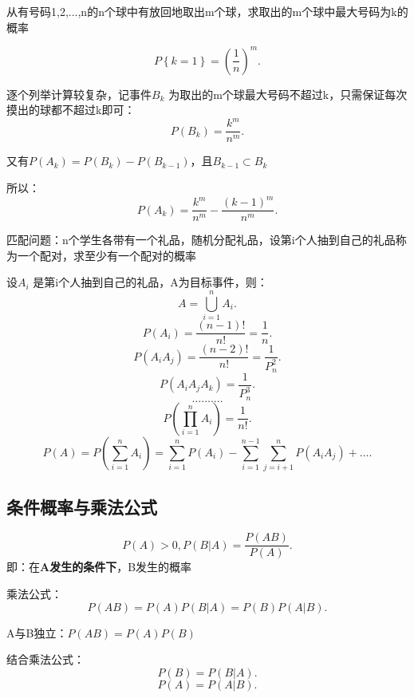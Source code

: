 \begin{eg}
    从有号码1,2,...,n的n个球中有放回地取出m个球，求取出的m个球中最大号码为k的概率

    \[
        P\left\{ k=1 \right\} =\left( \frac{1}{n} \right) ^m
    .\]  

    逐个列举计算较复杂，记事件$B_k$ 为取出的m个球最大号码不超过k，只需保证每次摸出的球都不超过k即可：
    \[
        P\left( B_{k} \right) =\frac{k^m}{n^m}
    .\] 

    又有$P\left( A_{k} \right) =P\left( B_{k} \right) -P\left( B_{k-1} \right) $，且$B_{k-1}\subset B_{k}$ 

    所以：\[
        P\left( A_k \right) =\frac{k^m}{n^m}-\frac{\left( k-1 \right) ^m}{n^m}
    .\] 
\end{eg}
 
\begin{eg}
    匹配问题：n个学生各带有一个礼品，随机分配礼品，设第i个人抽到自己的礼品称为一个配对，求至少有一个配对的概率

    设$A_{i}$ 是第i个人抽到自己的礼品，A为目标事件，则： \[
        A=\bigcup_{i=1}^{n}A_{i}
    .\] 
    \[
        P\left( A_{i} \right) =\frac{\left( n-1 \right) !}{n!}=\frac{1}{n}
    .\] 
    \[
        P\left( A_iA_j \right) =\frac{\left( n-2 \right) !}{n!}=\frac{1}{P_{n}^{2}}
    .\] 
    \[
        P\left( A_iA_jA_k \right) =\frac{1}{P_{n}^{3}}
    .\] 
    \[
        \ldots\ldots\ldots
    .\] 
    \[
        P\left( \prod_{i=1}^{n} A_i  \right) =\frac{1}{n!}
    .\] 
    \[
        P\left( A \right) =P\left( \sum_{i=1}^{n} A_{i} \right) = \sum_{i=1}^{n} P\left( A_{i} \right) -\sum_{i=1}^{n-1} \sum_{j=i+1}^{n} P\left( A_iA_j \right) +\ldots
    .\] 
\end{eg}


\subsection{条件概率与乘法公式}%
\label{sub:条件概率与乘法公式}
\begin{defi}
    \[
        P\left( A \right) >0,P\left( B | A \right) =\frac{P\left( AB \right) }{P\left( A \right) }
    .\] 
    即：在\textbf{A发生的条件下}，B发生的概率
\end{defi}
\begin{defi}
    乘法公式：\[
        P\left( AB \right) =P\left( A \right) P\left( B|A \right) =P\left( B \right) P\left( A|B \right) 
    .\] 
\end{defi}
\begin{notation}
    A与B独立：$P\left( AB \right) =P\left( A \right) P\left( B \right) $

    结合乘法公式：\[
        P\left( B \right) =P\left( B|A \right) 
    .\] 
    \[
        P\left( A \right) =P\left( A|B \right) 
    .\] 
\end{notation}
